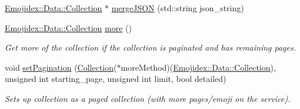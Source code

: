 \begin{DoxyCompactItemize}
\item 
\hyperlink{classEmojidex_1_1Data_1_1Collection}{Emojidex\+::\+Data\+::\+Collection} $\ast$ \hyperlink{classEmojidex_1_1Data_1_1Collection_abc94265d1af0e39ab7b12bbae92d4e4b}{merge\+J\+S\+ON} (std\+::string json\+\_\+string)
\item 
\hyperlink{classEmojidex_1_1Data_1_1Collection}{Emojidex\+::\+Data\+::\+Collection} \hyperlink{classEmojidex_1_1Data_1_1Collection_a98118ea678e6b838e05f8d41f7ef7416}{more} ()
\begin{DoxyCompactList}\small\item\em Get more of the collection if the collection is paginated and has remaining pages. \end{DoxyCompactList}\item 
void \hyperlink{classEmojidex_1_1Data_1_1Collection_ad18c6580a9afb8c132d4c158337e1524}{set\+Pagination} (\hyperlink{classEmojidex_1_1Data_1_1Collection}{Collection}($\ast$more\+Method)(\hyperlink{classEmojidex_1_1Data_1_1Collection}{Emojidex\+::\+Data\+::\+Collection}), unsigned int starting\+\_\+page, unsigned int limit, bool detailed)\hypertarget{classEmojidex_1_1Data_1_1Collection_ad18c6580a9afb8c132d4c158337e1524}{}\label{classEmojidex_1_1Data_1_1Collection_ad18c6580a9afb8c132d4c158337e1524}

\begin{DoxyCompactList}\small\item\em Sets up collection as a paged collection (with more pages/emoji on the service). \end{DoxyCompactList}\end{DoxyCompactItemize}
